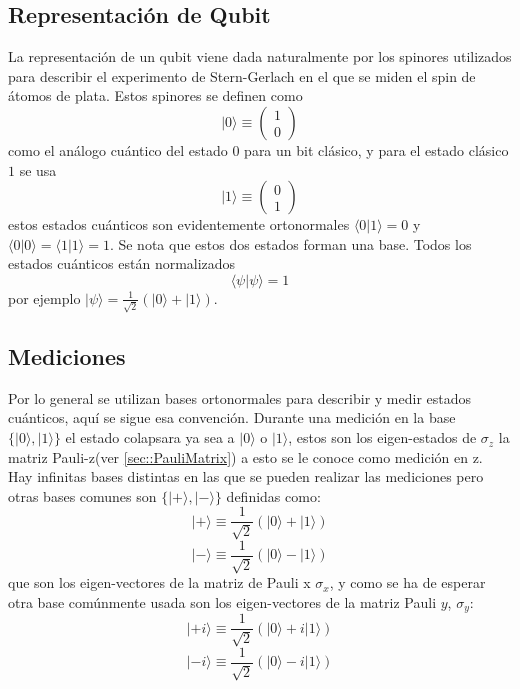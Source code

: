 \documentclass[a4paper]{article}
\begin{document}
\subsection{Representación de Qubit}
La representación de un qubit viene dada naturalmente por los spinores utilizados para describir el experimento de Stern-Gerlach en el que se miden el spin de átomos de plata. Estos spinores se definen como 
\begin{equation}\label{eq::qubit0}
|0\rangle\equiv
\begin{pmatrix}
		1\\
		0
	\end{pmatrix}
\end{equation}
como el análogo cuántico del estado $0$ para un bit clásico, y para el estado clásico $1$ se usa
\begin{equation}\label{eq::qubit1}
|1\rangle\equiv
\begin{pmatrix}
		0\\
		1
	\end{pmatrix}
\end{equation}
estos estados cuánticos son evidentemente ortonormales $\langle 0 | 1\rangle=0$ y $\langle 0 | 0\rangle=\langle 1 | 1\rangle=1$. Se nota que estos dos estados forman una base. Todos los estados cuánticos están normalizados
\begin{equation}
\langle \psi | \psi\rangle=1
\end{equation}
por ejemplo $|\psi\rangle=\frac{1}{\sqrt{2}}(|0\rangle+|1\rangle)$.
\subsection{Mediciones}
Por lo general se utilizan bases ortonormales para describir y medir estados cuánticos, aquí se sigue esa convención. Durante una medición en la base $\{|0\rangle, |1\rangle\}$ el estado colapsara ya sea a $|0\rangle$ o $|1\rangle$, estos son los eigen-estados de $\sigma_z$ la matriz Pauli-z(ver \ref{sec::PauliMatrix}) a esto se le conoce como medición en z.\\
Hay infinitas bases distintas en las que se pueden realizar las mediciones pero otras bases comunes son $\{|+\rangle, |-\rangle \}$ definidas como:
\begin{equation}
|+\rangle\equiv\frac{1}{\sqrt{2}}(|0\rangle+|1\rangle)
\end{equation}
\begin{equation}
|-\rangle\equiv\frac{1}{\sqrt{2}}(|0\rangle-|1\rangle)
\end{equation}
que son los eigen-vectores de la matriz de Pauli x $\sigma_x$, y como se ha de esperar otra base comúnmente usada son los eigen-vectores de la matriz Pauli $y$, $\sigma_y$:
\begin{equation}
|+i\rangle\equiv\frac{1}{\sqrt{2}}(|0\rangle+i|1\rangle)
\end{equation}
\begin{equation}
|-i\rangle\equiv\frac{1}{\sqrt{2}}(|0\rangle-i|1\rangle)
\end{equation}
\end{document}

